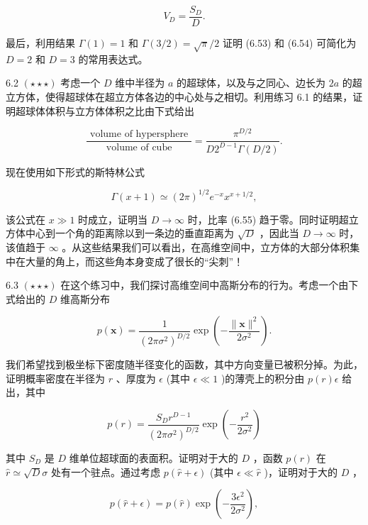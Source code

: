 \documentclass[10pt]{article}
\begin{document}
\[
{V}_{D} = \frac{{S}_{D}}{D}. \tag{6.54}
\]

最后，利用结果 \(\Gamma \left( 1\right)  = 1\) 和 \(\Gamma \left( {3/2}\right)  = \sqrt{\pi }/2\) 证明 (6.53) 和 (6.54) 可简化为 \(D = 2\) 和 \(D = 3\) 的常用表达式。

6.2 \(\left( {\star  \star   \star  }\right)\) 考虑一个 \(D\) 维中半径为 \(a\) 的超球体，以及与之同心、边长为 \({2a}\) 的超立方体，使得超球体在超立方体各边的中心处与之相切。利用练习 6.1 的结果，证明超球体体积与立方体体积之比由下式给出

\[
\frac{\text{ volume of hypersphere }}{\text{ volume of cube }} = \frac{{\pi }^{D/2}}{D{2}^{D - 1}\Gamma \left( {D/2}\right) }. \tag{6.55}
\]

现在使用如下形式的斯特林公式

\[
\Gamma \left( {x + 1}\right)  \simeq  {\left( 2\pi \right) }^{1/2}{e}^{-x}{x}^{x + 1/2}, \tag{6.56}
\]

该公式在 \(x \gg  1\) 时成立，证明当 \(D \rightarrow  \infty\) 时，比率 (6.55) 趋于零。同时证明超立方体中心到一个角的距离除以到一条边的垂直距离为 \(\sqrt{D}\) ，因此当 \(D \rightarrow  \infty\) 时，该值趋于 \(\infty\) 。从这些结果我们可以看出，在高维空间中，立方体的大部分体积集中在大量的角上，而这些角本身变成了很长的“尖刺”！

6.3 \(\left( {\star  \star   \star  }\right)\) 在这个练习中，我们探讨高维空间中高斯分布的行为。考虑一个由下式给出的 \(D\) 维高斯分布

\[
p\left( \mathbf{x}\right)  = \frac{1}{{\left( 2\pi {\sigma }^{2}\right) }^{D/2}}\exp \left( {-\frac{\parallel \mathbf{x}{\parallel }^{2}}{2{\sigma }^{2}}}\right) . \tag{6.57}
\]

我们希望找到极坐标下密度随半径变化的函数，其中方向变量已被积分掉。为此，证明概率密度在半径为 \(r\) 、厚度为 \(\epsilon\) (其中 \(\epsilon  \ll  1\) )的薄壳上的积分由 \(p\left( r\right) \epsilon\) 给出，其中

\[
p\left( r\right)  = \frac{{S}_{D}{r}^{D - 1}}{{\left( 2\pi {\sigma }^{2}\right) }^{D/2}}\exp \left( {-\frac{{r}^{2}}{2{\sigma }^{2}}}\right)  \tag{6.58}
\]

其中 \({S}_{D}\) 是 \(D\) 维单位超球面的表面积。证明对于大的 \(D\) ，函数 \(p\left( r\right)\) 在 \(\widehat{r} \simeq  \sqrt{D}\sigma\) 处有一个驻点。通过考虑 \(p\left( {\widehat{r} + \epsilon }\right)\) (其中 \(\epsilon  \ll  \widehat{r}\) )，证明对于大的 \(D\) ，

\[
p\left( {\widehat{r} + \epsilon }\right)  = p\left( \widehat{r}\right) \exp \left( {-\frac{3{\epsilon }^{2}}{2{\sigma }^{2}}}\right) , \tag{6.59}
\]
\end{document}
